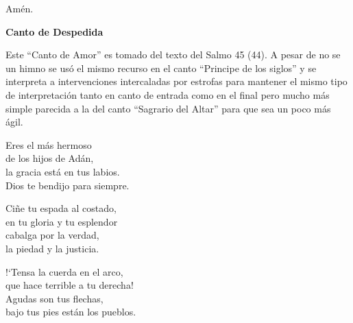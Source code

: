 \documentclass[12pt, letterpaper]{report}
\begin{document}
    \noindent
    Am\'en.
    \clearpage

    {%
\parindent 0pt
\noindent
\ifx\preLilyPondExample \undefined
\else
  \expandafter\preLilyPondExample
\fi
\def\lilypondbook{}%
%
\ifx\postLilyPondExample \undefined
\else
  \expandafter\postLilyPondExample
\fi
}
    \clearpage

    {%
\parindent 0pt
\noindent
\ifx\preLilyPondExample \undefined
\else
  \expandafter\preLilyPondExample
\fi
\def\lilypondbook{}%
%
\ifx\postLilyPondExample \undefined
\else
  \expandafter\postLilyPondExample
\fi
}
    \clearpage

    {%
\parindent 0pt
\noindent
\ifx\preLilyPondExample \undefined
\else
  \expandafter\preLilyPondExample
\fi
\def\lilypondbook{}%
%
\ifx\postLilyPondExample \undefined
\else
  \expandafter\postLilyPondExample
\fi
}
    \clearpage

    \begin{center}
      \LARGE \textbf{Canto de Despedida}
    \end{center}

    \Large Este ``Canto de Amor'' es tomado del texto del Salmo 45 (44). A pesar de no se un himno se us\'o el mismo recurso en el canto ``Principe de los siglos'' y se interpreta a intervenciones intercaladas por estrofas para mantener el mismo tipo de interpretaci\'on tanto en canto de entrada como en el final pero mucho m\'as simple parecida a la del canto ``Sagrario del Altar'' para que sea un poco m\'as \'agil.

    \noindent
    \LARGE Eres el m\'as hermoso\\
    de los hijos de Ad\'an,\\
    la gracia est\'a en tus labios.\\
    Dios te bendijo para siempre.

    \noindent
    Ci\~ne tu espada al costado,\\
    en tu gloria y tu esplendor\\
    cabalga por la verdad,\\
    la piedad y la justicia.

    \noindent
    !`Tensa la cuerda en el arco,\\
    que hace terrible a tu derecha!\\
    Agudas son tus flechas,\\
    bajo tus pies est\'an los pueblos.
\end{document}
